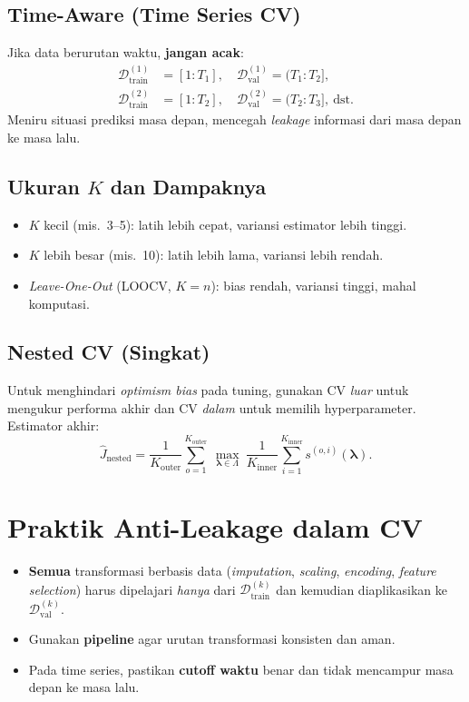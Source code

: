 \documentclass[11pt,a4paper]{article}
\begin{document}
\subsection{Time-Aware (Time Series CV)}
Jika data berurutan waktu, \textbf{jangan acak}:
\[
\begin{aligned}
\mathcal{D}_{\text{train}}^{(1)} &= [1 : T_1], \quad \mathcal{D}_{\text{val}}^{(1)} = (T_1 : T_2],\\
\mathcal{D}_{\text{train}}^{(2)} &= [1 : T_2], \quad \mathcal{D}_{\text{val}}^{(2)} = (T_2 : T_3], \ \text{dst.}
\end{aligned}
\]
Meniru situasi prediksi masa depan, mencegah \emph{leakage} informasi dari masa depan ke masa lalu.

\subsection{Ukuran $K$ dan Dampaknya}
\begin{itemize}[leftmargin=1.2em]
  \item $K$ kecil (mis.\ 3--5): latih lebih cepat, variansi estimator lebih tinggi.
  \item $K$ lebih besar (mis.\ 10): latih lebih lama, variansi lebih rendah.
  \item \emph{Leave-One-Out} (LOOCV, $K=n$): bias rendah, variansi tinggi, mahal komputasi.
\end{itemize}

\subsection{Nested CV (Singkat)}
Untuk menghindari \emph{optimism bias} pada tuning, gunakan CV \emph{luar} untuk mengukur performa akhir dan CV \emph{dalam} untuk memilih hyperparameter. Estimator akhir:
\[
\hat{J}_{\text{nested}} = \frac{1}{K_{\text{outer}}}\sum_{o=1}^{K_{\text{outer}}}\ \max_{\boldsymbol{\lambda}\in\Lambda}\ \frac{1}{K_{\text{inner}}}\sum_{i=1}^{K_{\text{inner}}} s^{(o,i)}(\boldsymbol{\lambda}).
\]

\section{Praktik Anti-Leakage dalam CV}
\begin{itemize}[leftmargin=1.2em]
  \item \textbf{Semua} transformasi berbasis data (\emph{imputation}, \emph{scaling}, \emph{encoding}, \emph{feature selection}) harus dipelajari \emph{hanya} dari \(\mathcal{D}_{\text{train}}^{(k)}\) dan kemudian diaplikasikan ke \(\mathcal{D}_{\text{val}}^{(k)}\).
  \item Gunakan \textbf{pipeline} agar urutan transformasi konsisten dan aman.
  \item Pada time series, pastikan \textbf{cutoff waktu} benar dan tidak mencampur masa depan ke masa lalu.
\end{itemize}
\end{document}
